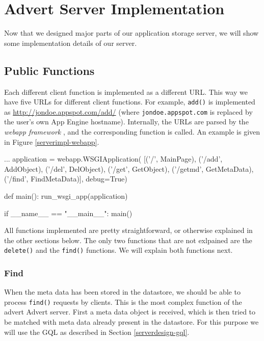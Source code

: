 \section{Advert Server Implementation}
\label{serverimpl}
Now that we designed major parts of our application storage server, we will
show some implementation details of our server.  

\subsection{Public Functions}
Each different client function is implemented as a different URL. This way we
have five URLs for different client functions. For example, \texttt{add()} is
implemented as \url{http://jondoe.appspot.com/add/} (where
\texttt{jondoe.appspot.com} is replaced by the user's own App Engine hostname).
Internally, the URLs are parsed by the \emph{webapp framework}
\cite{app-engine-webapp}, and the corresponding function is called. An example
is given in Figure \ref{serverimpl-webapp}.

\begin{figure*}[ht] %
\begin{center}
\begin{code}
...
application = webapp.WSGIApplication(
                                     [('/',      MainPage),
                                      ('/add',   AddObject),
                                      ('/del',   DelObject),
                                      ('/get',   GetObject),
                                      ('/getmd', GetMetaData),
                                      ('/find',  FindMetaData)],
                                     debug=True)

def main():
  run_wsgi_app(application)

if __name__ == "__main__":
  main()
\end{code}
\caption{An Example of the webapp Framework.\label{serverimpl-webapp}}
\end{center}
\end{figure*}

All functions implemented are pretty straightforward, or otherwise
explained in the other sections below. The only two functions that are not
exlpained are the \texttt{delete()} and the \texttt{find()} functions. We will
explain both functions next.

\subsubsection{Find}
\label{serverimpl-find}
When the meta data has been stored in the datastore, we should be able to process
\texttt{find()} requests by clients. This is the most complex function of the
advert Advert server. First a meta data object is received, which is then tried
to be matched with meta data already present in the datastore. For this purpose
we will use the GQL as described in Section \ref{serverdesign-gql}.

